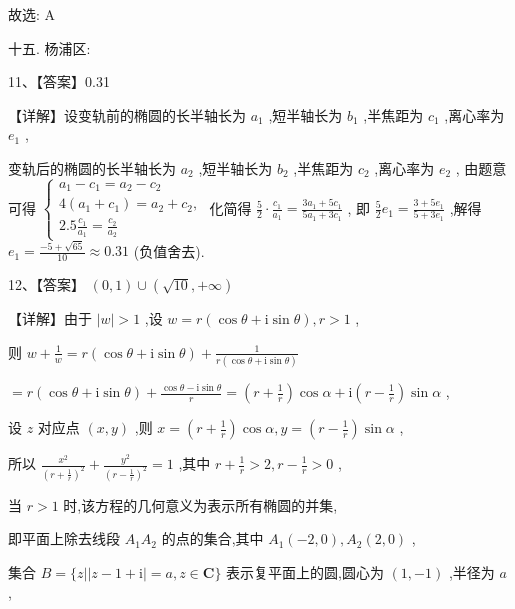 \documentclass[10pt]{article}
\begin{document}
故选: A

十五. 杨浦区:

11、【答案】0.31

【详解】设变轨前的椭圆的长半轴长为 \({a}_{1}\) ,短半轴长为 \({b}_{1}\) ,半焦距为 \({c}_{1}\) ,离心率为 \({e}_{1}\) ,

变轨后的椭圆的长半轴长为 \({a}_{2}\) ,短半轴长为 \({b}_{2}\) ,半焦距为 \({c}_{2}\) ,离心率为 \({e}_{2}\) , 由题意可得 \(\left\{  \begin{array}{l} {a}_{1} - {c}_{1} = {a}_{2} - {c}_{2} \\  4\left( {{a}_{1} + {c}_{1}}\right)  = {a}_{2} + {c}_{2}, \\  {2.5}\frac{{c}_{1}}{{a}_{1}} = \frac{{c}_{2}}{{a}_{2}} \end{array}\right.\) 化简得 \(\frac{5}{2} \cdot  \frac{{c}_{1}}{{a}_{1}} = \frac{3{a}_{1} + 5{c}_{1}}{5{a}_{1} + 3{c}_{1}}\) , 即 \(\frac{5}{2}{e}_{1} = \frac{3 + 5{e}_{1}}{5 + 3{e}_{1}}\) ,解得 \({e}_{1} = \frac{-5 + \sqrt{65}}{10} \approx  {0.31}\) (负值舍去).

12、【答案】 \(\left( {0,1}\right)  \cup  \left( {\sqrt{10}, + \infty }\right)\)

【详解】由于 \(\left| w\right|  > 1\) ,设 \(w = r\left( {\cos \theta  + \mathrm{i}\sin \theta }\right) ,r > 1\) ,

则 \(w + \frac{1}{w} = r\left( {\cos \theta  + \mathrm{i}\sin \theta }\right)  + \frac{1}{r\left( {\cos \theta  + \mathrm{i}\sin \theta }\right) }\)

\(= r\left( {\cos \theta  + \mathrm{i}\sin \theta }\right)  + \frac{\cos \theta  - \mathrm{i}\sin \theta }{r} = \left( {r + \frac{1}{r}}\right) \cos \alpha  + \mathrm{i}\left( {r - \frac{1}{r}}\right) \sin \alpha\) ,

设 \(z\) 对应点 \(\left( {x,y}\right)\) ,则 \(x = \left( {r + \frac{1}{r}}\right) \cos \alpha ,y = \left( {r - \frac{1}{r}}\right) \sin \alpha\) ,

所以 \(\frac{{x}^{2}}{{\left( r + \frac{1}{r}\right) }^{2}} + \frac{{y}^{2}}{{\left( r - \frac{1}{r}\right) }^{2}} = 1\) ,其中 \(r + \frac{1}{r} > 2,r - \frac{1}{r} > 0\) ,

当 \(r > 1\) 时,该方程的几何意义为表示所有椭圆的并集,

即平面上除去线段 \({A}_{1}{A}_{2}\) 的点的集合,其中 \({A}_{1}\left( {-2,0}\right) ,{A}_{2}\left( {2,0}\right)\) ,

集合 \(B = \{ z\left| \right| z - 1 + \mathrm{i} \mid   = a,z \in  \mathbf{C}\}\) 表示复平面上的圆,圆心为 \(\left( {1, - 1}\right)\) ,半径为 \(a\) ,
\end{document}
